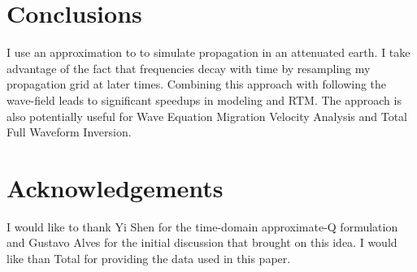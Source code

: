 \section{Conclusions}
I use an approximation to \cite{zhu} to simulate propagation in an attenuated earth. I take
advantage of the fact that frequencies decay with time by resampling my propagation grid
at later times. Combining this approach with following the wave-field leads to
significant speedups in modeling and RTM. The approach is also
potentially useful for Wave Equation Migration Velocity Analysis and Total
Full Waveform Inversion.



\section{Acknowledgements}
I would like to thank Yi Shen for the time-domain approximate-Q formulation and Gustavo Alves for
the initial discussion that brought on this idea. I would like than Total for providing the
data used in this paper.












